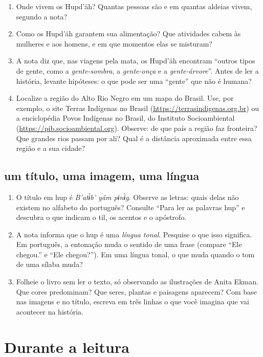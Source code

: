 \begin{enumerate}[label=\arabic*.,resume]
\item Onde vivem os Hupd'äh? Quantas pessoas são e em quantas aldeias
vivem, segundo a nota?
\item Como os Hupd'äh garantem sua alimentação? Que atividades cabem às
mulheres e aos homens, e em que momentos elas se misturam?
\item A nota diz que, nas viagens pela mata, os Hupd'äh encontram
``outros tipos de gente, como a \textit{gente-sombra}, a
\textit{gente-onça} e a \textit{gente-árvore}''. Antes de ler a
história, levante hipóteses: o que pode ser uma ``gente'' que não é
humana?
\item Localize a região do Alto Rio Negro em um mapa do Brasil. Use,
por exemplo, o site Terras Indígenas no Brasil
(\url{https://terrasindigenas.org.br}) ou a enciclopédia Povos
Indígenas no Brasil, do Instituto Socioambiental
(\url{https://pib.socioambiental.org}). Observe: de que país a região
faz fronteira? Que grandes rios passam por ali? Qual é a distância
aproximada entre essa região e a sua cidade?
\end{enumerate}

\section{um título, uma imagem, uma língua}

\begin{enumerate}[label=\arabic*.,resume]
\item O título em hup é \textit{B’atɨ́b’ yám pɨnɨ̀g}. Observe as letras:
quais delas não existem no alfabeto do português? Consulte ``Para ler as
palavras hup'' e descubra o que indicam o til, os acentos e o apóstrofo.
\item A nota informa que o hup é uma \textit{língua tonal}. Pesquise o
que isso significa. Em português, a entonação muda o sentido de uma
frase (compare ``Ele chegou.'' e ``Ele chegou?''). Em uma língua tonal,
o que muda quando o tom de uma sílaba muda?
\item Folheie o livro sem ler o texto, só observando as ilustrações de
Anita Ekman. Que cores predominam? Que seres, plantas e paisagens
aparecem? Com base nas imagens e no título, escreva em três linhas o que
você imagina que vai acontecer na história.
\end{enumerate}

\chapter{Durante a leitura}

